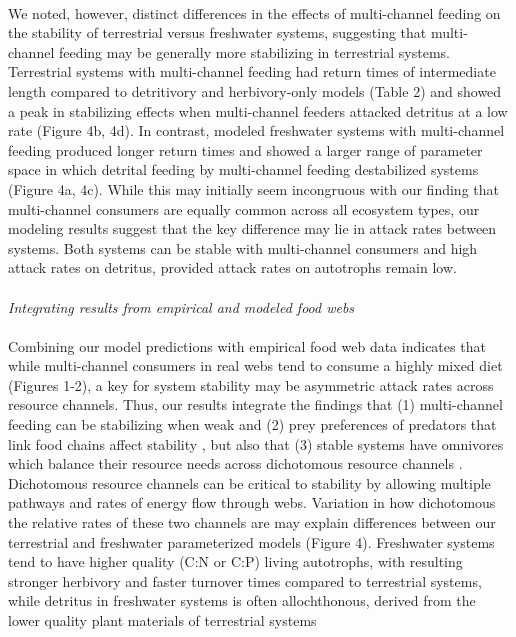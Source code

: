\documentclass[12pt,a4paper,oneside]{article}
\begin{document}
\\
\indent We noted, however, distinct differences in the effects of multi-channel feeding on
the stability of terrestrial versus freshwater systems, suggesting that
multi-channel feeding may be generally more stabilizing in terrestrial
systems. Terrestrial systems with multi-channel feeding had return times of intermediate length compared to detritivory and herbivory-only models (Table 2) and showed a peak in stabilizing effects when multi-channel feeders attacked detritus at a low rate (Figure 4b, 4d). In contrast, modeled freshwater systems with multi-channel feeding produced longer return times and showed a larger range of parameter space in which detrital feeding by multi-channel feeding destabilized systems (Figure 4a, 4c). While this may initially seem incongruous with our finding that
multi-channel consumers are equally common across all ecosystem types,
our modeling results suggest that the 
key difference may lie in attack rates between systems. Both systems
can be stable with multi-channel consumers and high attack rates on
detritus, provided attack rates on
autotrophs remain low.
\\
\\
\noindent \emph{Integrating results from empirical and modeled food webs}\\
\\
\indent Combining our model
predictions with empirical food web data indicates that while
multi-channel consumers in real webs tend to consume a highly mixed
diet (Figures 1-2), a key for system stability may be asymmetric
attack rates across resource channels. Thus, our results integrate the findings that (1) multi-channel feeding can be
stabilizing when weak \citep{McCann:1998} and (2) prey preferences of predators that link food chains affect stability \citep{Post:2000xx}, but also that (3) stable systems have omnivores
which balance their resource needs across dichotomous resource
channels \citep{Rooney:2006}. Dichotomous resource channels can be
critical to stability by allowing multiple pathways and rates of
energy flow through webs. Variation in how dichotomous 
the relative rates of these two channels are may explain differences between
our terrestrial and freshwater parameterized models (Figure 4). Freshwater systems
tend to have higher quality (C:N or C:P) living autotrophs, with
resulting stronger herbivory and faster turnover
times compared to terrestrial systems, while detritus in freshwater
systems is often allochthonous, derived from the lower
quality plant materials of terrestrial systems
\end{document}
